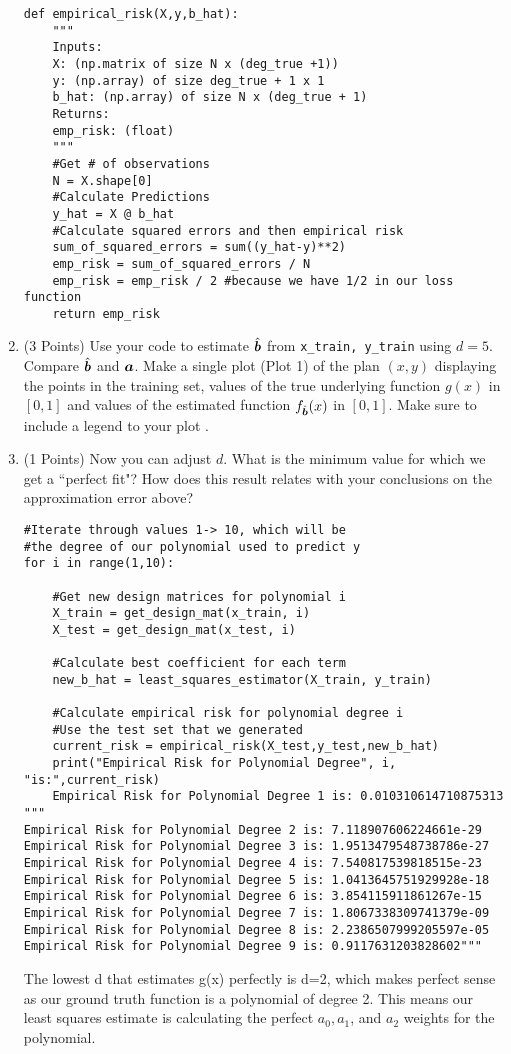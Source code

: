 \documentclass{article}
\newcommand{\bb}{b}
\begin{document}
\begin{enumerate}
    \begin{verbatim}
def empirical_risk(X,y,b_hat):
    """
    Inputs:
    X: (np.matrix of size N x (deg_true +1))
    y: (np.array) of size deg_true + 1 x 1
    b_hat: (np.array) of size N x (deg_true + 1)
    Returns:
    emp_risk: (float) 
    """
    #Get # of observations
    N = X.shape[0]
    #Calculate Predictions
    y_hat = X @ b_hat
    #Calculate squared errors and then empirical risk
    sum_of_squared_errors = sum((y_hat-y)**2)
    emp_risk = sum_of_squared_errors / N
    emp_risk = emp_risk / 2 #because we have 1/2 in our loss function
    return emp_risk
    \end{verbatim}
    \item (3 Points) Use your code to estimate $\hat{\bs \bb}$ from \texttt{x\_train, y\_train} using $d=5$. Compare $\hat{\boldsymbol{b}}$ and $\boldsymbol{a}$. Make a single plot (Plot 1) of the plan $(x,y)$ displaying the points in the training set, values of the true underlying function $g(x)$ in $[0,1]$ and values of the estimated function $f_{\hat{\bs \bb}}(x)$ in $[0,1]$. Make sure to include a legend to your plot .
    
    \item (1 Points) Now you can adjust $d$. What is the minimum value for which we get a ``perfect fit"? How does this result relates with your conclusions on the approximation error above? 
    \subitem
    \begin{verbatim}
#Iterate through values 1-> 10, which will be 
#the degree of our polynomial used to predict y
for i in range(1,10):
    
    #Get new design matrices for polynomial i
    X_train = get_design_mat(x_train, i)
    X_test = get_design_mat(x_test, i)
    
    #Calculate best coefficient for each term
    new_b_hat = least_squares_estimator(X_train, y_train)
    
    #Calculate empirical risk for polynomial degree i
    #Use the test set that we generated
    current_risk = empirical_risk(X_test,y_test,new_b_hat)
    print("Empirical Risk for Polynomial Degree", i, "is:",current_risk) 
    Empirical Risk for Polynomial Degree 1 is: 0.010310614710875313
"""
Empirical Risk for Polynomial Degree 2 is: 7.118907606224661e-29
Empirical Risk for Polynomial Degree 3 is: 1.9513479548738786e-27
Empirical Risk for Polynomial Degree 4 is: 7.540817539818515e-23
Empirical Risk for Polynomial Degree 5 is: 1.0413645751929928e-18
Empirical Risk for Polynomial Degree 6 is: 3.854115911861267e-15
Empirical Risk for Polynomial Degree 7 is: 1.8067338309741379e-09
Empirical Risk for Polynomial Degree 8 is: 2.2386507999205597e-05
Empirical Risk for Polynomial Degree 9 is: 0.9117631203828602"""
    \end{verbatim}
    The lowest d that estimates g(x) perfectly is d=2, which makes perfect sense as our ground truth function is a polynomial of degree 2. This means our least squares estimate is calculating the perfect $a_0, a_1$, and $a_2$ weights for the polynomial.
    
\setcounter{saveenum}{\value{enumi}}    
\end{enumerate}    
\end{document}
